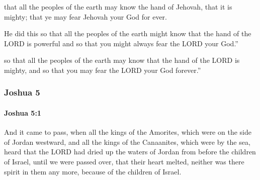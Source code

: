 			\begin{versebox}
					\item[BHS] 
					\item[ASV] that all the peoples of the earth may know the hand of Jehovah, that it is mighty; that ye may fear Jehovah your God for ever.
					\item[NIV] He did this so that all the peoples of the earth might know that the hand of the LORD is powerful and so that you might always fear the LORD your God.”
					\item[NRSV] so that all the peoples of the earth may know that the hand of the LORD is mighty, and so that you may fear the LORD your God forever.”
			\end{versebox}
	\subsubsection{Joshua 5} %
		\label{JOSHUA-5}

		\paragraph{Joshua 5:1} %
			\label{JOSHUA-5-1}

			And it came to pass, when all the kings of the Amorites, which were on the side of Jordan westward, and all the kings of the Canaanites, which were by the sea, heard that the LORD had dried up the waters of Jordan from before the children of Israel, until we were passed over, that their heart melted, neither was there spirit in them any more, because of the children of Israel.

